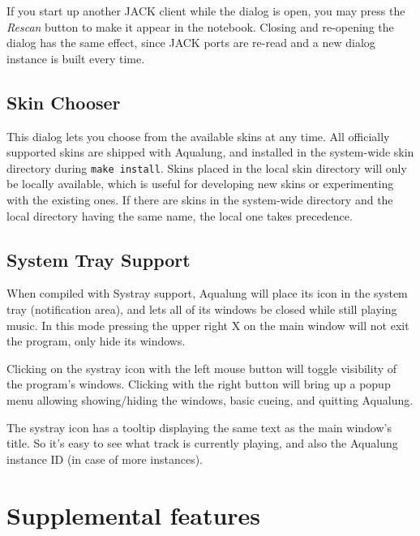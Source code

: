 \documentclass[10pt,english]{article}
\begin{document}
If you start up another JACK client while the dialog is
open, you may press the \textsl{Rescan} button to make it
appear in the notebook. Closing and re-opening the dialog has
the same effect, since JACK ports are re-read and a new dialog
instance is built every time.




\subsection{Skin Chooser\label{idp618352}}



\noindent This dialog lets you choose from the available skins at any
time. All officially supported skins are shipped with
Aqualung, and installed in the system-wide skin directory
during \texttt{make install}. Skins placed in the local skin
directory will only be locally available, which is useful for
developing new skins or experimenting with the existing
ones. If there are skins in the system-wide directory and the
local directory having the same name, the local one takes
precedence.




\subsection{System Tray Support\label{idp620368}}



\noindent When compiled with Systray support, Aqualung will place its
icon in the system tray (notification area), and lets all of
its windows be closed while still playing music. In this mode
pressing the upper right X on the main window will not exit
the program, only hide its windows.




Clicking on the systray icon with the left mouse button
will toggle visibility of the program's windows. Clicking with
the right button will bring up a popup menu allowing
showing/hiding the windows, basic cueing, and quitting
Aqualung.




The systray icon has a tooltip displaying the same text as
the main window's title. So it's easy to see what track is
currently playing, and also the Aqualung instance ID (in case
of more instances).






\section{Supplemental features\label{idp623424}}
\end{document}
